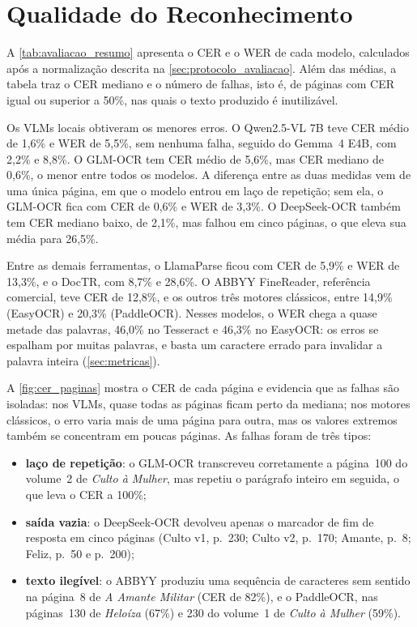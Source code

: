 \documentclass[noabntexcite,oneside]{ufsc-thesis-rn46-2019}
\begin{document}
\section{Qualidade do Reconhecimento}
\label{sec:qualidade}

A \autoref{tab:avaliacao_resumo} apresenta o CER e o WER de cada modelo, calculados
após a normalização descrita na \autoref{sec:protocolo_avaliacao}. Além das médias, a
tabela traz o CER mediano e o número de falhas, isto é, de páginas com CER igual ou
superior a 50\%, nas quais o texto produzido é inutilizável.



Os VLMs locais obtiveram os menores erros. O Qwen2.5-VL 7B teve CER médio de 1,6\% e WER
de 5,5\%, sem nenhuma falha, seguido do Gemma~4 E4B, com 2,2\% e 8,8\%. O GLM-OCR tem CER
médio de 5,6\%, mas CER mediano de 0,6\%, o menor entre todos os modelos. A diferença
entre as duas medidas vem de uma única página, em que o modelo entrou em laço de repetição;
sem ela, o GLM-OCR fica com CER de 0,6\% e WER de 3,3\%. O DeepSeek-OCR também tem CER
mediano baixo, de 2,1\%, mas falhou em cinco páginas, o que eleva sua média para 26,5\%.

Entre as demais ferramentas, o LlamaParse ficou com CER de 5,9\% e WER de 13,3\%, e o DocTR,
com 8,7\% e 28,6\%. O ABBYY FineReader, referência comercial, teve CER de 12,8\%, e os
outros três motores clássicos, entre 14,9\% (EasyOCR) e 20,3\% (PaddleOCR). Nesses modelos,
o WER chega a quase metade das palavras, 46,0\% no Tesseract e 46,3\% no EasyOCR: os erros se
espalham por muitas palavras, e basta um caractere errado para invalidar a palavra inteira
(\autoref{sec:metricas}).

A \autoref{fig:cer_paginas} mostra o CER de cada página e evidencia que as falhas são
isoladas: nos VLMs, quase todas as páginas ficam perto da mediana; nos motores clássicos,
o erro varia mais de uma página para outra, mas os valores extremos também se concentram
em poucas páginas. As falhas foram de três tipos:

\begin{itemize}
    \item \textbf{laço de repetição}: o GLM-OCR transcreveu corretamente a página~100 do
    volume~2 de \textit{Culto à Mulher}, mas repetiu o parágrafo inteiro em seguida, o que
    leva o CER a 100\%;
    \item \textbf{saída vazia}: o DeepSeek-OCR devolveu apenas o marcador de fim de
    resposta em cinco páginas (Culto v1, p.~230; Culto v2, p.~170; Amante, p.~8; Feliz,
    p.~50 e p.~200);
    \item \textbf{texto ilegível}: o ABBYY produziu uma sequência de caracteres sem sentido
    na página~8 de \textit{A Amante Militar} (CER de 82\%), e o PaddleOCR, nas páginas~130
    de \textit{Heloíza} (67\%) e 230 do volume~1 de \textit{Culto à Mulher} (59\%).
\end{itemize}
\end{document}
